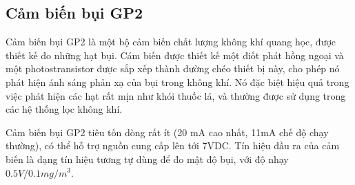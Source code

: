 \subsection{Cảm biến bụi GP2} 
Cảm biến bụi GP2 là một bộ cảm biến chất lượng không khí quang học, được thiết kế đo những hạt bụi. Cám biến được thiết kế một điốt phát hồng ngoại và một photostransistor được sắp xếp thành đường chéo thiết bị này, cho phép nó phát hiện ánh sáng phản xạ của bụi trong không khí.  Nó đặc biệt hiệu quả trong việc phát hiện các hạt rất mịn như khói thuốc lá, và thường được sử dụng trong các hệ thống lọc không khí.

Cảm biến bụi GP2 tiêu tốn dòng rất ít (20 mA cao nhất, 11mA chế độ chạy thường), có thể hỗ trợ nguồn cung cấp lên tới 7VDC. Tín hiệu đầu ra của cảm biến là dạng tín hiệu tương tự dùng để đo mật độ bụi, với độ nhạy $0.5V/0.1mg/{m}^{3}$.

